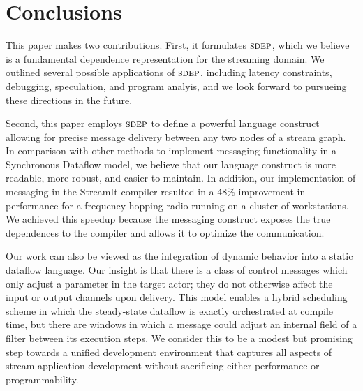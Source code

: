 \section{Conclusions}

This paper makes two contributions.  First, it formulates $\textsc{sdep}$,
which we believe is a fundamental dependence representation for the
streaming domain.  We outlined several possible applications of
$\textsc{sdep}$, including latency constraints, debugging, speculation, and
program analyis, and we look forward to pursueing these directions in
the future.

Second, this paper employs $\textsc{sdep}$ to define a powerful language
construct allowing for precise message delivery between any two nodes
of a stream graph.  In comparison with other methods to implement
messaging functionality in a Synchronous Dataflow model, we believe
that our language construct is more readable, more robust, and easier
to maintain.  In addition, our implementation of messaging in the
StreamIt compiler resulted in a 48\% improvement in performance for a
frequency hopping radio running on a cluster of workstations.  We
achieved this speedup because the messaging construct exposes the true
dependences to the compiler and allows it to optimize the
communication.

Our work can also be viewed as the integration of dynamic behavior
into a static dataflow language.  Our insight is that there is a class
of control messages which only adjust a parameter in the target actor;
they do not otherwise affect the input or output channels upon
delivery.  This model enables a hybrid scheduling scheme in which the
steady-state dataflow is exactly orchestrated at compile time, but
there are windows in which a message could adjust an internal field of
a filter between its execution steps.  We consider this to be a modest
but promising step towards a unified development environment that
captures all aspects of stream application development without
sacrificing either performance or programmability.
